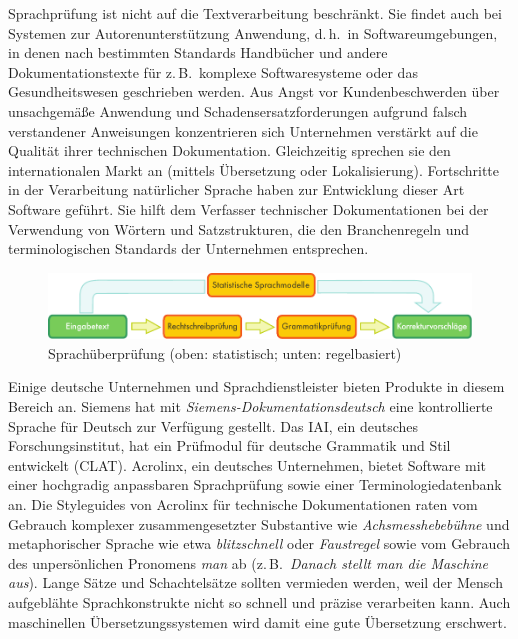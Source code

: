 \documentclass[]{../../metanetpaper}
\begin{document}
\begin{multicols}{2}
Sprachprüfung ist nicht auf die Textverarbeitung beschränkt. Sie findet auch bei Systemen zur Autorenunterstützung Anwendung, d.\,h.~in Softwareumgebungen, in denen nach bestimmten Standards Handbücher und andere Dokumentationstexte für z.\,B.~komplexe Softwaresysteme oder das Gesundheitswesen geschrieben werden. Aus Angst vor Kundenbeschwerden über unsachgemäße Anwendung und Schadensersatzforderungen aufgrund falsch verstandener Anweisungen konzentrieren sich Unternehmen verstärkt auf die Qualität ihrer technischen Dokumentation. Gleichzeitig sprechen sie den internationalen Markt an (mittels Übersetzung oder Lokalisierung). Fortschritte in der Verarbeitung natürlicher Sprache haben zur Entwicklung dieser Art Software geführt. Sie hilft dem Verfasser technischer Dokumentationen bei der Verwendung von Wörtern und Satzstrukturen, die den Branchenregeln und terminologischen Standards der Unternehmen entsprechen.

\begin{figure}[htb]
  \vspace{-9mm}
  \center
  \includegraphics[width=\textwidth]{../_media/german/language_checking}
  \caption{Sprachüberprüfung (oben: statistisch; unten: regelbasiert)}
  \label{fig:langcheckingaarch_de}
\end{figure}

Einige deutsche Unternehmen und Sprachdienstleister bieten Produkte in diesem Bereich an. Siemens hat mit \textit{Sie\-mens-Do\-ku\-men\-ta\-tions\-deutsch} eine kontrollierte Sprache für Deutsch zur Verfügung gestellt. Das IAI, ein deutsches Forschungsinstitut, hat ein Prüfmodul für deutsche Grammatik und Stil entwickelt (CLAT). Acrolinx, ein deutsches Unternehmen, bietet Software mit einer hochgradig anpassbaren Sprachprüfung sowie einer Terminologiedatenbank an. Die Styleguides von Acrolinx für technische Dokumentationen raten vom Gebrauch komplexer zusammengesetzter Substantive wie \textit{Achsmesshebebühne} und metaphorischer Sprache wie etwa \textit{blitzschnell} oder \textit{Faustregel} sowie vom Gebrauch des unpersönlichen Pronomens \textit{man} ab (z.\,B.~\textit{Danach stellt man die Maschine aus}). Lange Sätze und Schachtelsätze sollten vermieden werden, weil der Mensch aufgeblähte Sprachkonstrukte nicht so schnell und präzise verarbeiten kann. Auch maschinellen Übersetzungssystemen wird damit eine gute Übersetzung erschwert.


\end{multicols}
\end{document}
